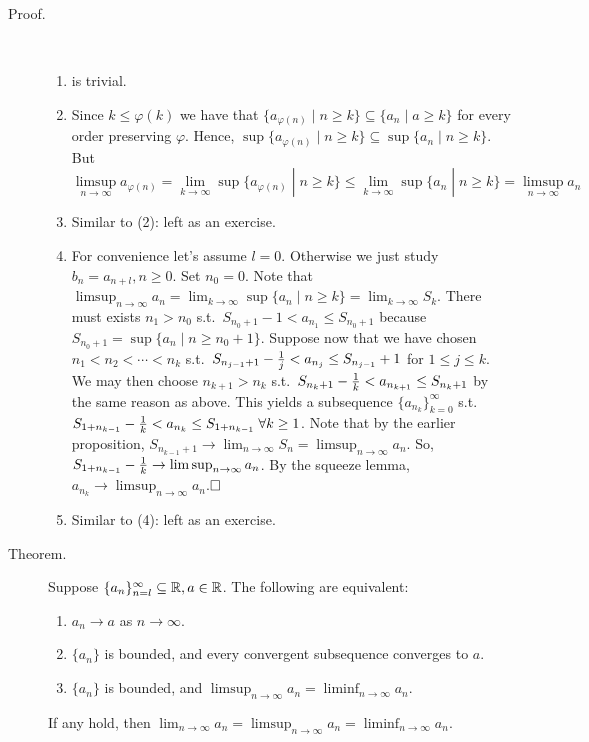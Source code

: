 \documentclass[letterpaper,11pt]{article}
\begin{document}
\begin{description}
\item[Proof.] \text{}\vspace{-0.2in}\\
  \begin{enumerate}[1)]
  \item is trivial.
  \item Since $k\le \varphi(k)$ we have that
      $\{a_{\varphi(n)}\;|\;n\ge k\}\subseteq\{a_n\;|\;a\ge k\}$
      for every order preserving $\varphi$. Hence,
      $\sup\{a_{\varphi(n)}\;|\;n\ge k\}\subseteq\sup\{a_n\;|\;n\ge k\}$.
      But \[
        \limsup_{n\to\infty}a_{\varphi(n)}=
        \lim_{k\to\infty}\sup\{a_{\varphi(n)}\;|\;n\ge k\}\le
        \lim_{k\to\infty}\sup\{a_n\;|\;n\ge k\}=\limsup_{n\to\infty}a_n
      \]
  \item Similar to (2): left as an exercise.
  \item For convenience let's assume $l=0$. Otherwise we just study
      $b_n=a_{n+l}, n\ge 0$. Set $n_0=0$. Note that
      $\limsup_{n\to\infty}a_n=
      \lim_{k\to\infty}\sup\{a_n\;|\;n\ge k\}=\lim_{k\to\infty}S_k$.
      There must exists $n_1>n_0$ s.t.\ $S_{n_0+1}-1<a_{n_1}\le S_{n_0+1}$
      because $S_{n_0+1}=\sup\{a_n\;|\;n\ge n_0+1\}$. Suppose now that
      we have chosen $n_1<n_2<\cdots<n_k$ s.t.\
      $S_{n_{j-1}+1}-\frac{1}{j}<a_{n_j}\le S_{n_{j-1}}+1$ for $1\le j\le k$.
      We may then choose $n_{k+1}>n_k$ s.t.\
      $S_{n_k+1}-\frac{1}{k}<a_{n_{k+1}}\le S_{n_k+1}$
      by the same reason as above. This yields a subsequence
      $\{a_{n_k}\}_{k=0}^\infty$ s.t.\
      $S_{1+n_{k-1}}-\frac{1}{k}<a_{n_k}\le S_{1+n_{k-1}}\;\forall k\ge 1$.
      Note that by the earlier proposition,
      $S_{n_{k-1}+1}\to\lim_{n\to\infty}S_n=\limsup_{n\to\infty}a_n$. So,
      $S_{1+n_{k-1}}-\frac{1}{k}\to\limsup_{n\to\infty}a_n$. By the squeeze
      lemma, $a_{n_k}\to\limsup_{n\to\infty}a_n$.$\hfill\square$
  \item Similar to (4): left as an exercise.
  \end{enumerate}


\item[Theorem.] Suppose $\{a_n\}_{n=l}^\infty\subseteq\mathbb{R}, a\in\mathbb{R}$. The following are equivalent:
  \begin{enumerate}[1)]
  \item $a_n\to a$ as $n\to\infty$.
  \item $\{a_n\}$ is bounded, and every convergent subsequence converges to $a$.
  \item $\{a_n\}$ is bounded, and $\limsup_{n\to\infty}a_n=\liminf_{n\to\infty}a_n$.
  \end{enumerate}
  If any hold, then
  $\lim_{n\to\infty}a_n=\limsup_{n\to\infty}a_n=\liminf_{n\to\infty}a_n$.


\end{description}
\end{document}
